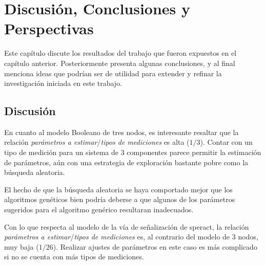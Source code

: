 \chapter{Discusión, Conclusiones y Perspectivas}\label{ch:conclusiones}


Este capítulo discute los resultados del trabajo que fueron expuestos en el capítulo anterior. Posteriormente presenta algunas conclusiones, y al final menciona ideas que podrían ser de utilidad para extender y refinar la investigación iniciada en este trabajo. 

\section{Discusión}
En cuanto al modelo Booleano de tres nodos, es interesante resaltar que la relación \emph{parámetros a estimar}/\emph{tipos de mediciones} es alta ($1/3$). Contar con un tipo de medición para un sistema de 3 componentes parece permitir la estimación de parámetros, aún con una estrategia de exploración bastante pobre como la búsqueda aleatoria.

El hecho de que la búsqueda aleatoria se haya comportado mejor que los algoritmos genéticos bien podría deberse a que algunos de los parámetros sugeridos para el algoritmo genérico resultaran inadecuados.%

Con lo que respecta al modelo de la vía de señalización de speract, la relación \emph{parámetros a estimar}/\emph{tipos de mediciones} es, al contrario del modelo de 3 nodos, muy baja ($1/26$). Realizar ajustes de parámetros en este caso es más complicado si no se cuenta con más tipos de mediciones.


